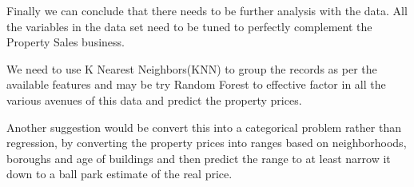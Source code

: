 \documentclass[
  a3paper,
]{article}
\begin{document}
Finally we can conclude that there needs to be further analysis with the
data. All the variables in the data set need to be tuned to perfectly
complement the Property Sales business.

We need to use K Nearest Neighbors(KNN) to group the records as per the
available features and may be try Random Forest to effective factor in
all the various avenues of this data and predict the property prices.

Another suggestion would be convert this into a categorical problem
rather than regression, by converting the property prices into ranges
based on neighborhoods, boroughs and age of buildings and then predict
the range to at least narrow it down to a ball park estimate of the real
price.
\end{document}
